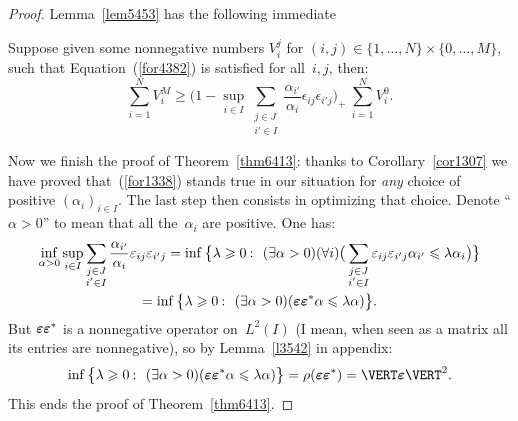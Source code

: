 \begin{proof}
Lemma~\ref{lem5453} has the following immediate
\begin{Cor}\label{cor1307}
Suppose given some nonnegative numbers $V^j_i$ for
$(i,j) \in \{1,\ldots,N\} \times \{0,\ldots,M\}$,
such that Equation~(\ref{for4382}) is satisfied for all~$i,j$,
then:
\[\label{for1338} \sum_{i=1}^N V^M_i \geq
\bigg( 1 - \sup_{i\in I} \sum_{\substack{j\in J\\i'\in I}} \frac{\alpha_{i'}}{\alpha_i} \epsilon_{ij}\epsilon_{i'j}
\bigg)_{\!\!+\,\,} \sum_{i=1}^N V^0_i .\]
\end{Cor}

Now we finish the proof of Theorem~\ref{thm6413}:
thanks to Corollary~\ref{cor1307}
we have proved that~(\ref{for1338}) stands true in our situation
for \emph{any} choice of positive $(\alpha_i)_{i\in I}$.
The last step then consists in optimizing that choice.
Denote ``$\alpha>0$'' to mean that all the~$\alpha_i$ are positive. One has:
\begin{multline}
\inf_{\alpha>0} \sup_{i\in I} \sum_{\substack{j\in J\\i'\in I}} \frac{\alpha_{i'}}{\alpha_i} \epsilon_{ij}\epsilon_{i'j}
= \inf \big\{ \lambda \geq 0 \colon
(\exists \alpha > 0) (\forall i) \big( \sum_{\substack{j\in J\\i'\in I}} \epsilon_{ij}\epsilon_{i'j}\alpha_{i'}
\leq \lambda \alpha_i \big) \big\} \\
= \inf \big\{ \lambda \geq 0 \colon (\exists \alpha > 0)
(\boldepsilon\boldepsilon^* \alpha \leq \lambda\alpha) \big\}.
\end{multline}
But $\boldsymbol{\varepsilon}\boldsymbol{\varepsilon}^*$ is a nonnegative operator on~$L^2(I)$
(I mean, when seen as a matrix all its entries are nonnegative),
so by Lemma~\ref{l3542} in appendix:
%
\[\label{for2029}
\inf \big\{ \lambda\geq 0 \colon (\exists \alpha > 0) (\boldepsilon\boldepsilon^* \alpha \leq \lambda\alpha) \big\}
= \rho(\boldepsilon\boldepsilon^*) = \VERT \boldepsilon \VERT^2 .\]
This ends the proof of Theorem~\ref{thm6413}.
\end{proof}\endgroup


